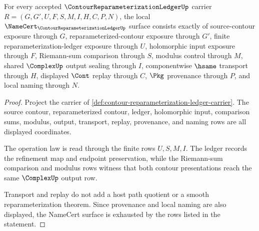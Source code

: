 \begin{theorem}
\label{thm:contour-reparameterization-ledger-namecert-obligations}
For every accepted $\ContourReparameterizationLedgerUp$ carrier $R=(G,G',U,F,S,M,I,H,C,P,N)$, the local $\NameCert_{\ContourReparameterizationLedgerUp}$ surface consists exactly of source-contour exposure through $G$, reparameterized-contour exposure through $G'$, finite reparameterization-ledger exposure through $U$, holomorphic input exposure through $F$, Riemann-sum comparison through $S$, modulus control through $M$, shared $\ComplexUp$ output sealing through $I$, componentwise $\hsame$ transport through $H$, displayed $\Cont$ replay through $C$, $\Pkg$ provenance through $P$, and local naming through $N$.
\end{theorem}
\begin{proof}
Project the carrier of \autoref{def:contour-reparameterization-ledger-carrier}. The source contour, reparameterized contour, ledger, holomorphic input, comparison sums, modulus, output, transport, replay, provenance, and naming rows are all displayed coordinates.

The operation law is read through the finite rows $U,S,M,I$. The ledger records the refinement map and endpoint preservation, while the Riemann-sum comparison and modulus rows witness that both contour presentations reach the same $\ComplexUp$ output row.

Transport and replay do not add a host path quotient or a smooth reparameterization theorem. Since provenance and local naming are also displayed, the NameCert surface is exhausted by the rows listed in the statement.
\end{proof}

